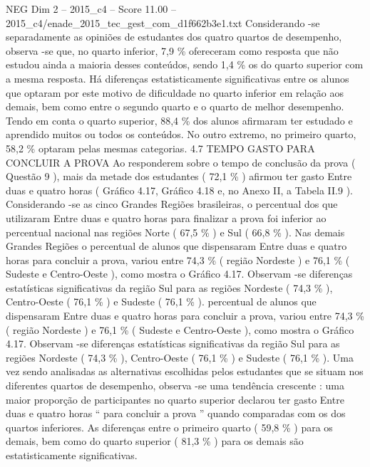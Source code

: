 \begin{textsample}{NEG Dim 2 – 2015\_c4 – Score 11.00 – 2015\_c4/enade\_2015\_tec\_gest\_com\_d1f662b3e1.txt}
Considerando -se separadamente as opiniões de estudantes dos quatro quartos de desempenho, observa -se que, no quarto inferior, 7,9 \% ofereceram como resposta que não estudou ainda a maioria desses conteúdos, sendo 1,4 \% os do quarto superior com a mesma resposta.
Há diferenças estatisticamente significativas entre os alunos que optaram por este motivo de dificuldade no quarto inferior em relação aos demais, bem como entre o segundo quarto e o quarto de melhor desempenho.
Tendo em conta o quarto superior, 88,4 \% dos alunos afirmaram ter estudado e aprendido muitos ou todos os conteúdos.
No outro extremo, no primeiro quarto, 58,2 \% optaram pelas mesmas categorias. 4.7 TEMPO GASTO PARA CONCLUIR A PROVA Ao responderem sobre o tempo de conclusão da prova ( Questão 9 ), mais da metade dos estudantes ( 72,1 \% ) afirmou ter gasto Entre duas e quatro horas ( Gráfico 4.17, Gráfico 4.18 e, no Anexo II, a Tabela II.9 ).
Considerando -se as cinco Grandes Regiões brasileiras, o percentual dos que utilizaram Entre duas e quatro horas para finalizar a prova foi inferior ao percentual nacional nas regiões Norte ( 67,5 \% ) e Sul ( 66,8 \% ).
Nas demais Grandes Regiões o percentual de alunos que dispensaram Entre duas e quatro horas para concluir a prova, variou entre 74,3 \% ( região Nordeste ) e 76,1 \% ( Sudeste e Centro-Oeste ), como mostra o Gráfico 4.17.
Observam -se diferenças estatísticas significativas da região Sul para as regiões Nordeste ( 74,3 \% ), Centro-Oeste ( 76,1 \% ) e Sudeste ( 76,1 \% ). percentual de alunos que dispensaram Entre duas e quatro horas para concluir a prova, variou entre 74,3 \% ( região Nordeste ) e 76,1 \% ( Sudeste e Centro-Oeste ), como mostra o Gráfico 4.17.
Observam -se diferenças estatísticas significativas da região Sul para as regiões Nordeste ( 74,3 \% ), Centro-Oeste ( 76,1 \% ) e Sudeste ( 76,1 \% ).
Uma vez sendo analisadas as alternativas escolhidas pelos estudantes que se situam nos diferentes quartos de desempenho, observa -se uma tendência crescente : uma maior proporção de participantes no quarto superior declarou ter gasto Entre duas e quatro horas “ para concluir a prova ” quando comparadas com os dos quartos inferiores.
As diferenças entre o primeiro quarto ( 59,8 \% ) para os demais, bem como do quarto superior ( 81,3 \% ) para os demais são estatisticamente significativas.

\end{textsample}
